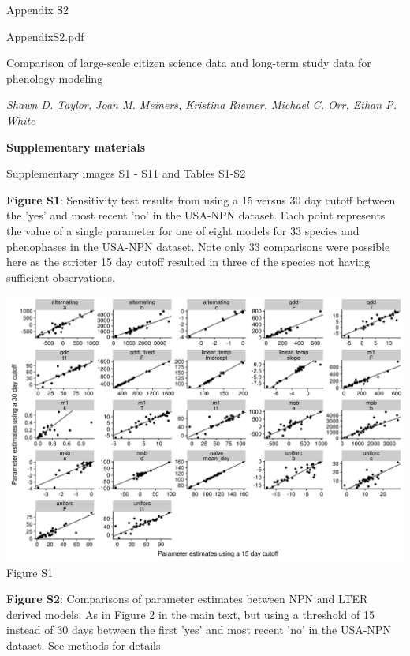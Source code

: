 \documentclass[a4paper,12pt]{article}
\begin{document}
\Large
Appendix S2

AppendixS2.pdf

Comparison of large-scale citizen science data and long-term study data for phenology modeling

\normalsize
\textit{Shawn D. Taylor, Joan M. Meiners, Kristina Riemer, Michael C. Orr, Ethan P. White}

\textbf{\large Supplementary materials}

Supplementary images S1 - S11 and Tables S1-S2


\newpage

\textbf{Figure S1}: Sensitivity test results from using a 15 versus 30 day cutoff between the 'yes' and most recent 'no' in the USA-NPN dataset. Each point represents the value of a single parameter for one of eight models for 33 species and phenophases in the USA-NPN dataset. Note only 33 comparisons were possible here as the stricter 15 day cutoff resulted in three of the species not having sufficient observations. 

\newpage

\begin{center}
	\centering
		\includegraphics[width=1\textwidth]{figure_s1_parameter_estimates_from_cutoff_sensitivity.png}
	Figure S1
\end{center}

\newpage

\newpage

\textbf{Figure S2}: Comparisons of parameter estimates between NPN and LTER derived models. As in Figure 2 in the main text, but using a threshold of 15 instead of 30 days between the first 'yes' and most recent 'no' in the USA-NPN dataset. See methods for details. 
\end{document}
